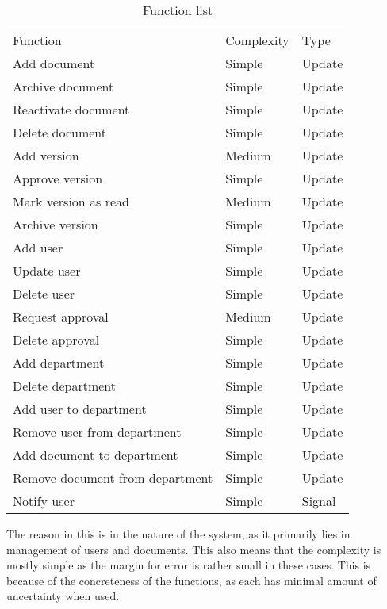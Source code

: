 \begin{table}[H]
\centering
\begin{tabular}{lll}
Function						& Complexity & Type    \\
Add document					& Simple     & Update  \\
Archive document				& Simple     & Update  \\
Reactivate document				& Simple     & Update  \\  %
Delete document					& Simple     & Update  \\
Add version						& Medium	 & Update  \\
Approve version					& Simple     & Update  \\
Mark version as read			& Medium     & Update  \\ %
Archive version					& Simple     & Update  \\
Add user						& Simple     & Update  \\
Update user						& Simple     & Update  \\
Delete user						& Simple     & Update  \\
Request approval				& Medium     & Update  \\
Delete approval					& Simple     & Update  \\
Add department					& Simple     & Update  \\
Delete department				& Simple	 & Update  \\
Add user to department			& Simple     & Update  \\
Remove user from department		& Simple     & Update  \\
Add document to department		& Simple     & Update  \\
Remove document from department & Simple     & Update  \\
Notify user						& Simple	 & Signal  \\
\end{tabular}
\caption{Function list}
\end{table}

The reason in this is in the nature of the system, as it primarily lies in management of users and documents.
This also means that the complexity is mostly simple as the margin for error is rather small in these cases.
This is because of the concreteness of the functions, as each has minimal amount of uncertainty when used.

